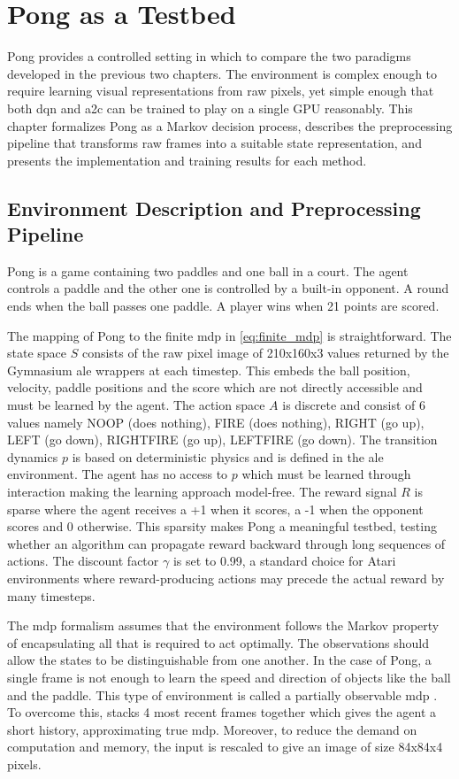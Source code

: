 \chapter {Pong as a Testbed}
\label{chap:pong}
Pong provides a controlled setting in which to compare the two paradigms developed in the previous two chapters. The environment is complex enough to require learning visual representations from raw pixels, yet simple enough that both \acrshort{dqn} and \acrshort{a2c} can be trained to play on a single GPU reasonably. This chapter formalizes Pong as a Markov decision process, describes the preprocessing pipeline that transforms raw frames into a suitable state representation, and presents the implementation and training results for each method.

\section{Environment Description and Preprocessing Pipeline}
\label{sec:env_preprocessing}
Pong is a game containing two paddles and one ball in a court. The agent controls a paddle and the other one is controlled by a built-in opponent. A round ends when the ball passes one paddle. A player wins when 21 points are scored.

The mapping of Pong to the finite \acrshort{mdp} in \eqref{eq:finite_mdp} is straightforward. The state space $S$ consists of the raw pixel image of 210x160x3 values returned by the Gymnasium \acrshort{ale} wrappers at each timestep. This embeds the ball position, velocity, paddle positions and the score which are not directly accessible and must be learned by the agent. The action space $A$ is discrete and consist of 6 values namely NOOP (does nothing), FIRE (does nothing), RIGHT (go up), LEFT (go down), RIGHTFIRE (go up), LEFTFIRE (go down). The transition dynamics $p$ is based on deterministic physics and is defined in the \acrshort{ale} environment. The agent has no access to $p$ which must be learned through interaction making the learning approach model-free. The reward signal $R$ is sparse where the agent receives a +1 when it scores, a -1 when the opponent scores and 0 otherwise. This sparsity makes Pong a meaningful testbed, testing whether an algorithm can propagate reward backward through long sequences of actions. The discount factor $\gamma$ is set to 0.99, a standard choice for Atari environments where reward-producing actions may precede the actual reward by many timesteps.

The \acrshort{mdp} formalism assumes that the environment follows the Markov property of encapsulating all that is required to act optimally. The observations should allow the states to be distinguishable from one another. In the case of Pong, a single frame is not enough to learn the speed and direction of objects like the ball and the paddle. This type of environment is called a partially observable \acrshort{mdp} \citep{kaelblingPlanningActingPartially1998}. To overcome this, \citet[p.~534]{mnihHumanlevelControlDeep2015} stacks 4 most recent frames together which gives the agent a short history, approximating true \acrshort{mdp}. Moreover, to reduce the demand on computation and memory, the input is rescaled to give an image of size 84x84x4 pixels.

